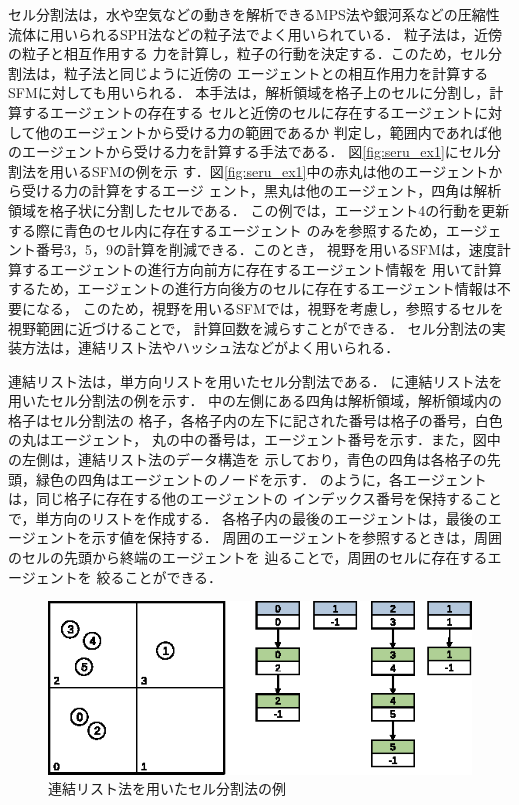 セル分割法は，水や空気などの動きを解析できるMPS法\cite{mps}や銀河系などの圧縮性
流体に用いられるSPH法\cite{sph}などの粒子法でよく用いられている．
粒子法は，近傍の粒子と相互作用する
力を計算し，粒子の行動を決定する．このため，セル分割法は，粒子法と同じように近傍の
エージェントとの相互作用力を計算するSFMに対しても用いられる．
本手法は，解析領域を格子上のセルに分割し，計算するエージェントの存在する
セルと近傍のセルに存在するエージェントに対して他のエージェントから受ける力の範囲であるか
判定し，範囲内であれば他のエージェントから受ける力を計算する手法である．
図\ref{fig:seru_ex1}にセル分割法を用いるSFMの例を示
す．図\ref{fig:seru_ex1}中の赤丸は他のエージェントから受ける力の計算をするエージ
ェント，黒丸は他のエージェント，四角は解析領域を格子状に分割したセルである．
この例では，エージェント4の行動を更新する際に青色のセル内に存在するエージェント
のみを参照するため，エージェント番号3，5，9の計算を削減できる．このとき，
視野を用いるSFMは，速度計算するエージェントの進行方向前方に存在するエージェント情報を
用いて計算するため，エージェントの進行方向後方のセルに存在するエージェント情報は不要になる，
このため，視野を用いるSFMでは，視野を考慮し，参照するセルを視野範囲に近づけることで，
計算回数を減らすことができる．
セル分割法の実装方法は，連結リスト法やハッシュ法などがよく用いられる\cite{cell1}\cite{cell2}．

連結リスト法は，単方向リストを用いたセル分割法である．
に連結リスト法を用いたセル分割法の例を示す．
中の左側にある四角は解析領域，解析領域内の格子はセル分割法の
格子，各格子内の左下に記された番号は格子の番号，白色の丸はエージェント，
丸の中の番号は，エージェント番号を示す．また，図中の左側は，連結リスト法のデータ構造を
示しており，青色の四角は各格子の先頭，緑色の四角はエージェントのノードを示す．
のように，各エージェントは，同じ格子に存在する他のエージェントの
インデックス番号を保持することで，単方向のリストを作成する．
各格子内の最後のエージェントは，最後のエージェントを示す値を保持する．
周囲のエージェントを参照するときは，周囲のセルの先頭から終端のエージェントを
辿ることで，周囲のセルに存在するエージェントを
絞ることができる．

\begin{figure}[t]
 \begin{center}
  \includegraphics[width=11.5cm,clip]{figure/serubunkatu_serurinku.eps}
  \caption{連結リスト法を用いたセル分割法の例}
  \label{fig:renketu_list}
 \end{center}
\end{figure}

